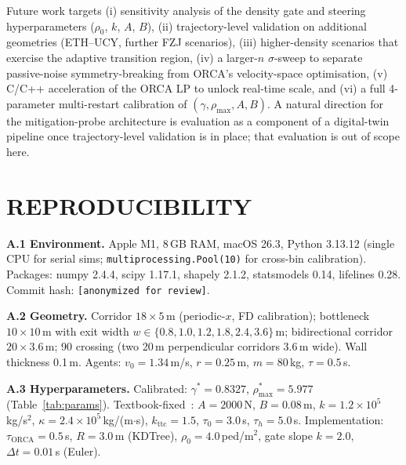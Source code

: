 \documentclass[a4paper,twoside]{article}
\begin{document}
Future work targets (i) sensitivity analysis of the density gate and steering hyperparameters ($\rho_0$, $k$, $A$, $B$), (ii) trajectory-level validation on additional geometries (ETH--UCY, further FZJ scenarios), (iii) higher-density scenarios that exercise the adaptive transition region, (iv) a larger-$n$ $\sigma$-sweep to separate passive-noise symmetry-breaking from ORCA's velocity-space optimisation, (v) C/C++ acceleration of the ORCA LP to unlock real-time scale, and (vi) a full 4-parameter multi-restart calibration of $(\gamma, \rho_{\max}, A, B)$. A natural direction for the mitigation-probe architecture is evaluation as a component of a digital-twin pipeline once trajectory-level validation is in place; that evaluation is out of scope here.



{\small
}

\appendix

\section{\uppercase{Reproducibility}}
\label{sec:appendix}

\footnotesize

\textbf{A.1 Environment.} Apple M1, 8\,GB RAM, macOS 26.3, Python 3.13.12 (single CPU for serial sims; \texttt{multiprocessing.Pool(10)} for cross-bin calibration). Packages: numpy 2.4.4, scipy 1.17.1, shapely 2.1.2, statsmodels 0.14, lifelines 0.28. Commit hash: \texttt{[anonymized for review]}.

\textbf{A.2 Geometry.} Corridor $18{\times}5$\,m (periodic-$x$, FD calibration); bottleneck $10{\times}10$\,m with exit width $w\in\{0.8,1.0,1.2,1.8,2.4,3.6\}$\,m; bidirectional corridor $20{\times}3.6$\,m; 90\textdegree{} crossing (two 20\,m perpendicular corridors 3.6\,m wide). Wall thickness 0.1\,m. Agents: $v_0=1.34$\,m/s, $r=0.25$\,m, $m=80$\,kg, $\tau=0.5$\,s.

\textbf{A.3 Hyperparameters.} Calibrated: $\gamma^*=0.8327$, $\rho_{\max}^*=5.977$ (Table~\ref{tab:params}). Textbook-fixed~\cite{Helbing00,Karamouzas14,VandenBerg11}: $A=2000$\,N, $B=0.08$\,m, $k=1.2{\times}10^{5}$\,kg/s$^2$, $\kappa=2.4{\times}10^{5}$\,kg/(m$\cdot$s), $k_{\text{ttc}}=1.5$, $\tau_0=3.0$\,s, $\tau_h=5.0$\,s. Implementation: $\tau_{\text{ORCA}}=0.5$\,s, $R=3.0$\,m (KDTree), $\rho_0=4.0$\,ped/m$^2$, gate slope $k=2.0$, $\Delta t=0.01$\,s (Euler).
\end{document}

